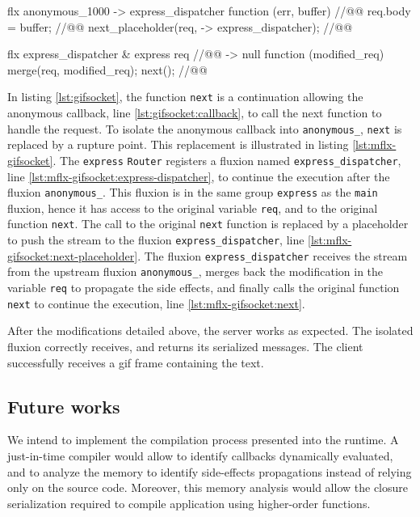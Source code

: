 \begin{code}[flx, caption={Simplified modification on the compiled result},label={lst:mflx-gifsocket}]
flx anonymous_1000
-> express_dispatcher
  function (err, buffer) { //@\label{lst:mflx-gifsocket:callback}@
    req.body = buffer; //@\label{lst:mflx-gifsocket:buffer}@
    next_placeholder(req, -> express_dispatcher); //@\label{lst:mflx-gifsocket:next-placeholder}@
  }

flx express_dispatcher & express {req} //@\label{lst:mflx-gifsocket:express-dispatcher}@
-> null
  function (modified_req) {
    merge(req, modified_req);
    next(); //@\label{lst:mflx-gifsocket:next}@
  }
\end{code}

In listing \ref{lst:gifsocket}, the function \texttt{next} is a continuation allowing the anonymous callback, line \ref{lst:gifsocket:callback}, to call the next function to handle the request.
To isolate the anonymous callback into \texttt{anonymous\_}, \texttt{next} is replaced by a rupture point.
This replacement is illustrated in listing \ref{lst:mflx-gifsocket}.
The \texttt{express} \texttt{Router} registers a fluxion named \texttt{express\_\-dispatcher}, line \ref{lst:mflx-gifsocket:express-dispatcher}, to continue the execution after the fluxion \texttt{anonymous\_}.
This fluxion is in the same group \texttt{express} as the \texttt{main} fluxion, hence it has access to the original variable \texttt{req}, and to the original function \texttt{next}.
The call to the original \texttt{next} function is replaced by a placeholder to push the stream to the fluxion \texttt{express\_\-dispatcher}, line \ref{lst:mflx-gifsocket:next-placeholder}.
The fluxion \texttt{express\_\-dispatcher} receives the stream from the upstream fluxion \texttt{anonymous\_}, merges back the modification in the variable \texttt{req} to propagate the side effects, and finally calls the original function \texttt{next} to continue the execution, line \ref{lst:mflx-gifsocket:next}.

After the modifications detailed above, the server works as expected.
The isolated fluxion correctly receives, and returns its serialized messages.
The client successfully receives a gif frame containing the text.

\subsection{Future works}

We intend to implement the compilation process presented into the runtime.
A just-in-time compiler would allow to identify callbacks dynamically evaluated, and to analyze the memory to identify side-effects propagations instead of relying only on the source code.
Moreover, this memory analysis would allow the closure serialization required to compile application using higher-order functions.